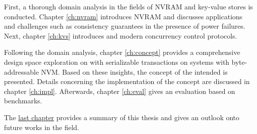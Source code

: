 First, a thorough domain analysis in the fields of \ac{NVRAM} and key-value
stores is conducted. Chapter \ref{ch:nvram} introduces \ac{NVRAM} and discusses
applications and challenges such as consistency guarantees in the presence of
power failures. Next, chapter \ref{ch:kvs} introduces \kvsp and modern
concurrency control protocols.

Following the domain analysis, chapter \ref{ch:concept} provides a comprehensive
design space exploration on \kvsp with serializable transactions on systems with
byte-addressable \ac{NVM}. Based on these insights, the concept of the intended
\kvs is presented. Details concerning the implementation of the concept are
discussed in chapter \ref{ch:impl}. Afterwards, chapter \ref{ch:eval} gives an
evaluation based on benchmarks.

The \hyperref[ch:summary]{last chapter} provides a summary of this thesis and
gives an outlook onto future works in the field.

